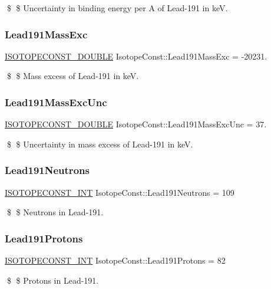 \$ \$ Uncertainty in binding energy per A of Lead-\/191 in keV. \mbox{\label{group___isotope_const-_lead-_pb191_ga5207f1a8d1a85605377d9bf6adfb76cf}} 
\subsubsection{\texorpdfstring{Lead191\+Mass\+Exc}{Lead191MassExc}}
{\footnotesize\ttfamily \mbox{\hyperlink{group___isotope_const-_macros_ga8f45a7272ce02c0b4c65c44636ed719a}{I\+S\+O\+T\+O\+P\+E\+C\+O\+N\+S\+T\+\_\+\+D\+O\+U\+B\+LE}} Isotope\+Const\+::\+Lead191\+Mass\+Exc = -\/20231.}

\$ \$ Mass excess of Lead-\/191 in keV. \mbox{\label{group___isotope_const-_lead-_pb191_ga5283d36bd2bc1a2c33534109d2dccc30}} 
\subsubsection{\texorpdfstring{Lead191\+Mass\+Exc\+Unc}{Lead191MassExcUnc}}
{\footnotesize\ttfamily \mbox{\hyperlink{group___isotope_const-_macros_ga8f45a7272ce02c0b4c65c44636ed719a}{I\+S\+O\+T\+O\+P\+E\+C\+O\+N\+S\+T\+\_\+\+D\+O\+U\+B\+LE}} Isotope\+Const\+::\+Lead191\+Mass\+Exc\+Unc = 37.}

\$ \$ Uncertainty in mass excess of Lead-\/191 in keV. \mbox{\label{group___isotope_const-_lead-_pb191_ga8abe12661e91a3b5e4f3ae4118067eb7}} 
\subsubsection{\texorpdfstring{Lead191\+Neutrons}{Lead191Neutrons}}
{\footnotesize\ttfamily \mbox{\hyperlink{group___isotope_const-_macros_ga5f18360b3e99483a35c32d789e62621c}{I\+S\+O\+T\+O\+P\+E\+C\+O\+N\+S\+T\+\_\+\+I\+NT}} Isotope\+Const\+::\+Lead191\+Neutrons = 109}

\$ \$ Neutrons in Lead-\/191. \mbox{\label{group___isotope_const-_lead-_pb191_gac6bfe4c1c26fee92742d2b5dbd232f96}} 
\subsubsection{\texorpdfstring{Lead191\+Protons}{Lead191Protons}}
{\footnotesize\ttfamily \mbox{\hyperlink{group___isotope_const-_macros_ga5f18360b3e99483a35c32d789e62621c}{I\+S\+O\+T\+O\+P\+E\+C\+O\+N\+S\+T\+\_\+\+I\+NT}} Isotope\+Const\+::\+Lead191\+Protons = 82}

\$ \$ Protons in Lead-\/191. 